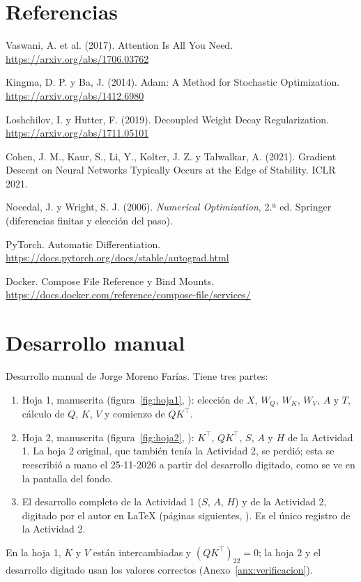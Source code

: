 \documentclass[10pt]{article}
\begin{document}
\section*{Referencias}
\begin{sloppypar}
\begin{enumerate}[nosep, label={[\arabic*]}]
  \item Vaswani, A. et al. (2017). Attention Is All You Need. \url{https://arxiv.org/abs/1706.03762}
  \item Kingma, D. P. y Ba, J. (2014). Adam: A Method for Stochastic Optimization.
        \url{https://arxiv.org/abs/1412.6980}
  \item Loshchilov, I. y Hutter, F. (2019). Decoupled Weight Decay Regularization.
        \url{https://arxiv.org/abs/1711.05101}
  \item Cohen, J. M., Kaur, S., Li, Y., Kolter, J. Z. y Talwalkar, A. (2021). Gradient Descent on
        Neural Networks Typically Occurs at the Edge of Stability. ICLR 2021.
  \item Nocedal, J. y Wright, S. J. (2006). \emph{Numerical Optimization}, 2.ª ed. Springer
        (diferencias finitas y elección del paso).
  \item PyTorch. Automatic Differentiation. \url{https://docs.pytorch.org/docs/stable/autograd.html}
  \item Docker. Compose File Reference y Bind Mounts. \url{https://docs.docker.com/reference/compose-file/services/}
\end{enumerate}
\end{sloppypar}

\appendix
\section{Desarrollo manual}\label{anx:escaneo}
Desarrollo manual de Jorge Moreno Farías. Tiene tres partes:
\begin{enumerate}[nosep]
  \item Hoja 1, manuscrita (figura~\ref{fig:hoja1}, ):
        elección de $X$, $W_Q$, $W_K$, $W_V$, $A$ y $T$, cálculo de $Q$, $K$, $V$ y comienzo de
        $QK^\top$.
  \item Hoja 2, manuscrita (figura~\ref{fig:hoja2}, ):
        $K^\top$, $QK^\top$, $S$, $A$ y $H$ de la Actividad 1. La hoja 2 original, que también tenía la
        Actividad 2, se perdió; esta se reescribió a mano el 25-11-2026 a partir del desarrollo
        digitado, como se ve en la pantalla del fondo.
  \item El desarrollo completo de la Actividad 1 ($S$, $A$, $H$) y de la Actividad 2, digitado por el
        autor en \LaTeX{} (páginas siguientes, ).
        Es el único registro de la Actividad 2.
\end{enumerate}
En la hoja 1, $K$ y $V$ están intercambiadas y $(QK^\top)_{22} = 0$; la hoja 2 y el desarrollo
digitado usan los valores correctos (Anexo~\ref{anx:verificacion}).
\end{document}
